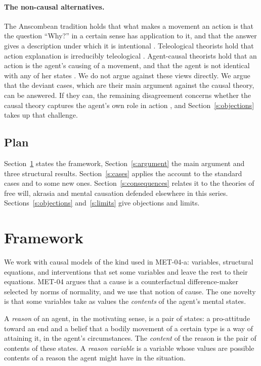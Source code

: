 \documentclass{situationist-preprint}
\begin{document}
\paragraph{The non-causal alternatives.} The Anscombean tradition holds that what makes a movement an action is that the question \enquote{Why?} in a certain sense has application to it, and that the answer gives a description under which it is intentional \citep{Anscombe1957,Thompson2008}. Teleological theorists hold that action explanation is irreducibly teleological \citep{Wilson1989,Sehon2005}. Agent-causal theorists hold that an action is the agent's causing of a movement, and that the agent is not identical with any of her states \citep{Hyman2015}. We do not argue against these views directly. We argue that the deviant cases, which are their main argument against the causal theory, can be answered. If they can, the remaining disagreement concerns whether the causal theory captures the agent's own role in action \citep{Velleman1992}, and Section~\ref{s:objections} takes up that challenge.

\subsection{Plan}

Section~\ref{s:framework} states the framework, Section~\ref{s:argument} the main argument and three structural results. Section~\ref{s:cases} applies the account to the standard cases and to some new ones. Section~\ref{s:consequences} relates it to the theories of free will, akrasia and mental causation defended elsewhere in this series. Sections~\ref{s:objections} and~\ref{s:limits} give objections and limits.

\section{Framework}\label{s:framework}

We work with causal models of the kind used in MET-04-a: variables, structural equations, and interventions that set some variables and leave the rest to their equations. MET-04 argues that a cause is a counterfactual difference-maker selected by norms of normality, and we use that notion of cause. The one novelty is that some variables take as values the \emph{contents} of the agent's mental states.

\begin{definition}[Reason]\label{d:reason}
A \emph{reason} of an agent, in the motivating sense, is a pair of states: a pro-attitude toward an end and a belief that a bodily movement of a certain type is a way of attaining it, in the agent's circumstances. The \emph{content} of the reason is the pair of contents of these states. A \emph{reason variable} is a variable whose values are possible contents of a reason the agent might have in the situation.
\end{definition}
\end{document}
